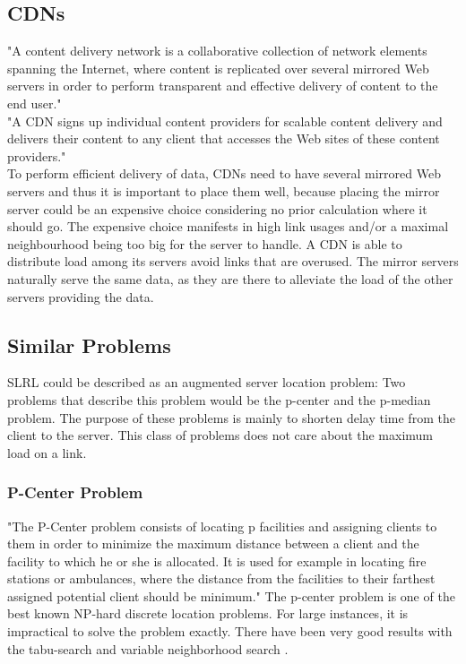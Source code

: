 \documentclass [12pt]{article}
\begin{document}
\subsection {CDNs}
"A content delivery network is a collaborative collection of network elements spanning
the Internet, where content is replicated over several mirrored Web servers in order
to perform transparent and effective delivery of content to the end user."\cite[p. 3]{Buyya:2008:CDN:1457653}\\
"A CDN signs up individual content providers for scalable content delivery and delivers
their content to any client that accesses the Web sites of these content providers."\cite[p. 193]{Rabinovich:2002:WCR:507107}\\
To perform efficient delivery of data, CDNs need to have several mirrored Web servers
and thus it is important to place them well, because placing the mirror server 
could be an expensive choice considering no prior calculation where it should go. 
The expensive choice manifests in high link usages and/or a maximal neighbourhood being
too big for the server to handle. A CDN is able to distribute load among its servers avoid
links that are overused.
The mirror servers naturally serve the same data, as they are there to alleviate the 
load of the other servers providing the data.

\subsection {Similar Problems}
SLRL could be described as an augmented server location problem: 
Two problems that describe this problem would be the p-center and the
p-median problem. The purpose of these problems is mainly to shorten delay
time from the client to the server. 
This class of problems does not care about the maximum load on a link.

\subsubsection {P-Center Problem}
"The P-Center problem consists of locating p facilities and assigning clients
to them in order to minimize the maximum distance between a client and the facility
to which he or she is allocated. It is used for example in locating fire stations or ambulances,
where the distance from the facilities 
to their farthest assigned potential client should be minimum."
The p-center problem is one of the best known NP-hard discrete location problems.
For large instances, it is impractical to solve the problem exactly.
There have been very good results with the tabu-search and variable neighborhood search \cite{Mladenovic00solvingthe}
\cite{KarivHakimi1979}.
\end{document}
